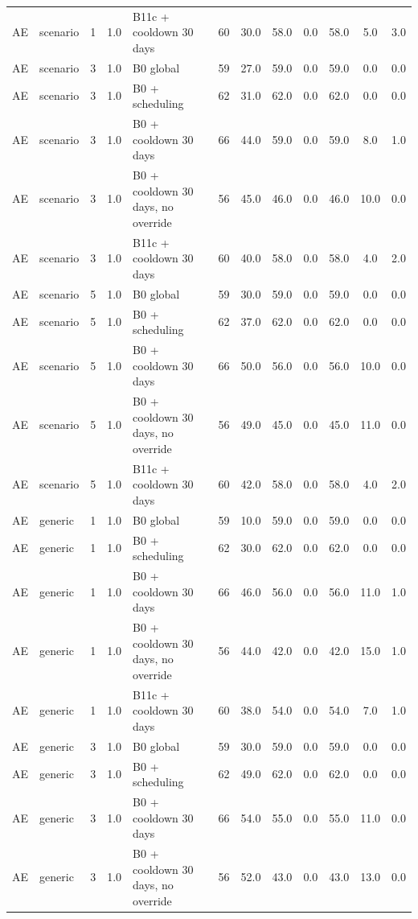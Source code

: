 \begin{longtable}{lllllccccccc}
AE & scenario & 1 & 1.0 & B11c + cooldown 30 days & 60 & 30.0 & 58.0 & 0.0 & 58.0 & 5.0 & 3.0 \\
AE & scenario & 3 & 1.0 & B0 global & 59 & 27.0 & 59.0 & 0.0 & 59.0 & 0.0 & 0.0 \\
AE & scenario & 3 & 1.0 & B0 + scheduling & 62 & 31.0 & 62.0 & 0.0 & 62.0 & 0.0 & 0.0 \\
AE & scenario & 3 & 1.0 & B0 + cooldown 30 days & 66 & 44.0 & 59.0 & 0.0 & 59.0 & 8.0 & 1.0 \\
AE & scenario & 3 & 1.0 & B0 + cooldown 30 days, no override & 56 & 45.0 & 46.0 & 0.0 & 46.0 & 10.0 & 0.0 \\
AE & scenario & 3 & 1.0 & B11c + cooldown 30 days & 60 & 40.0 & 58.0 & 0.0 & 58.0 & 4.0 & 2.0 \\
AE & scenario & 5 & 1.0 & B0 global & 59 & 30.0 & 59.0 & 0.0 & 59.0 & 0.0 & 0.0 \\
AE & scenario & 5 & 1.0 & B0 + scheduling & 62 & 37.0 & 62.0 & 0.0 & 62.0 & 0.0 & 0.0 \\
AE & scenario & 5 & 1.0 & B0 + cooldown 30 days & 66 & 50.0 & 56.0 & 0.0 & 56.0 & 10.0 & 0.0 \\
AE & scenario & 5 & 1.0 & B0 + cooldown 30 days, no override & 56 & 49.0 & 45.0 & 0.0 & 45.0 & 11.0 & 0.0 \\
AE & scenario & 5 & 1.0 & B11c + cooldown 30 days & 60 & 42.0 & 58.0 & 0.0 & 58.0 & 4.0 & 2.0 \\
AE & generic & 1 & 1.0 & B0 global & 59 & 10.0 & 59.0 & 0.0 & 59.0 & 0.0 & 0.0 \\
AE & generic & 1 & 1.0 & B0 + scheduling & 62 & 30.0 & 62.0 & 0.0 & 62.0 & 0.0 & 0.0 \\
AE & generic & 1 & 1.0 & B0 + cooldown 30 days & 66 & 46.0 & 56.0 & 0.0 & 56.0 & 11.0 & 1.0 \\
AE & generic & 1 & 1.0 & B0 + cooldown 30 days, no override & 56 & 44.0 & 42.0 & 0.0 & 42.0 & 15.0 & 1.0 \\
AE & generic & 1 & 1.0 & B11c + cooldown 30 days & 60 & 38.0 & 54.0 & 0.0 & 54.0 & 7.0 & 1.0 \\
AE & generic & 3 & 1.0 & B0 global & 59 & 30.0 & 59.0 & 0.0 & 59.0 & 0.0 & 0.0 \\
AE & generic & 3 & 1.0 & B0 + scheduling & 62 & 49.0 & 62.0 & 0.0 & 62.0 & 0.0 & 0.0 \\
AE & generic & 3 & 1.0 & B0 + cooldown 30 days & 66 & 54.0 & 55.0 & 0.0 & 55.0 & 11.0 & 0.0 \\
AE & generic & 3 & 1.0 & B0 + cooldown 30 days, no override & 56 & 52.0 & 43.0 & 0.0 & 43.0 & 13.0 & 0.0 \\

\end{longtable}
